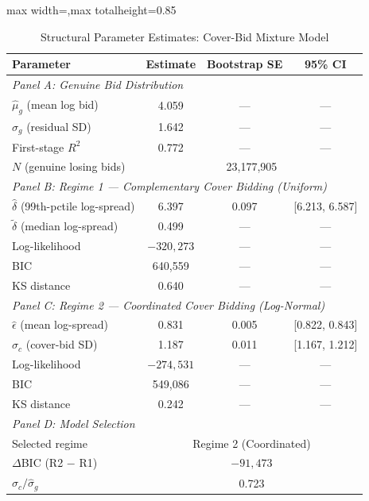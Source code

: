 \begin{table}[!htbp]
\centering
\caption{Structural Parameter Estimates: Cover-Bid Mixture Model}
\label{tab:structural_params}
\begin{adjustbox}{max width=\textwidth,max totalheight=0.85\textheight}
\begin{threeparttable}
\small
\begin{tabular}{lccc}
\toprule
Parameter & Estimate & Bootstrap SE & 95\% CI \\
\midrule
\multicolumn{4}{l}{\textit{Panel A: Genuine Bid Distribution}} \\[3pt]
$\hat{\mu}_g$ (mean log bid) & 4.059 & --- & --- \\
$\hat{\sigma}_g$ (residual SD) & 1.642 & --- & --- \\
First-stage $R^2$ & 0.772 & --- & --- \\
$N$ (genuine losing bids) & \multicolumn{3}{c}{23,177,905} \\
\midrule
\multicolumn{4}{l}{\textit{Panel B: Regime 1 --- Complementary Cover Bidding (Uniform)}} \\[3pt]
$\hat{\delta}$ (99th-pctile log-spread) & 6.397 & 0.097 & [6.213, 6.587] \\
$\tilde{\delta}$ (median log-spread) & 0.499 & --- & --- \\
Log-likelihood & $-320,273$ & --- & --- \\
BIC & 640,559 & --- & --- \\
KS distance & 0.640 & --- & --- \\
\midrule
\multicolumn{4}{l}{\textit{Panel C: Regime 2 --- Coordinated Cover Bidding (Log-Normal)}} \\[3pt]
$\hat{\epsilon}$ (mean log-spread) & 0.831 & 0.005 & [0.822, 0.843] \\
$\hat{\sigma}_c$ (cover-bid SD) & 1.187 & 0.011 & [1.167, 1.212] \\
Log-likelihood & $-274,531$ & --- & --- \\
BIC & 549,086 & --- & --- \\
KS distance & 0.242 & --- & --- \\
\midrule
\multicolumn{4}{l}{\textit{Panel D: Model Selection}} \\[3pt]
Selected regime & \multicolumn{3}{c}{Regime 2 (Coordinated)} \\
$\Delta$BIC (R2 $-$ R1) & \multicolumn{3}{c}{$-91,473$} \\
$\hat{\sigma}_c / \hat{\sigma}_g$ & \multicolumn{3}{c}{0.723} \\

\end{tabular}
\end{threeparttable}
\end{adjustbox}
\end{table}
